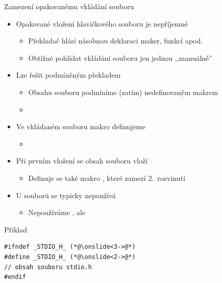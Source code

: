 \begin{frame}[fragile]{Zamezení opakovanému vkládání souboru}

  \begin{itemize}
    \item Opakované vložení hlavičkového souboru je nepříjemné
    \begin{itemize}
      \item Překladač hlásí násobnou deklaraci maker, funkcí apod.
      \item Obtížné pohlídat vkládání souboru jen jednou ,,manuálně''
    \end{itemize}

    \pause

    \item Lze řešit podmíněným překladem
    \begin{itemize}
      \item Obsahu souboru podmíníme (zatím) nedefinovaným makrem
      \item {}
    \end{itemize}

    \pause

    \item Ve vkládaném souboru makro definujeme
    \begin{itemize}
      \item {}
    \end{itemize}

    \pause

    \item Při prvním vložení se obsah souboru vloží
    \begin{itemize}
      \item Definuje se také makro , které zamezí
        2.\ rozvinutí
    \end{itemize}

    \pause

    \item U souborů  se typicky nepoužívá
    \begin{itemize}
      \item Nepoužíváme , ale
    \end{itemize}

  \end{itemize}


\begin{block}{Příklad}
\begin{lstlisting}
#ifndef _STDIO_H_ (*@\onslide<3->@*)
#define _STDIO_H_ (*@\onslide<2->@*)
// obsah souboru stdio.h
#endif
\end{lstlisting}
\end{block}

\end{frame}

